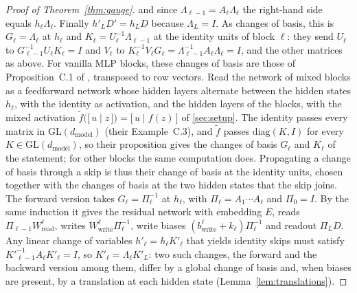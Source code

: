 \documentclass[10pt]{article}
\theoremstyle{definition}
\theoremstyle{remark}
\newcommand{\Wread}{W_{\mathrm{read}}}
\newcommand{\Wwrite}{W_{\mathrm{write}}}
\newcommand{\dm}{d_{\mathrm{model}}}
\newcommand{\GL}{\mathrm{GL}}
\begin{document}
\begin{proof}[Proof of Theorem~\ref{thm:gauge}]
and since $\Lambda_{\ell-1} = A_\ell\Lambda_\ell$ the right-hand side equals $h_\ell\Lambda_\ell$. Finally $h'_LD' = h_LD$ because $\Lambda_L = I$. As changes of basis, this is $G_\ell = \Lambda_\ell$ at $h_\ell$ and $K_\ell = U_\ell^{-1}\Lambda_{\ell-1}$ at the identity units of block $\ell$: they send $U_\ell$ to $G_{\ell-1}^{-1}U_\ell K_\ell = I$ and $V_\ell$ to $K_\ell^{-1}V_\ell G_\ell = \Lambda_{\ell-1}^{-1}A_\ell\Lambda_\ell = I$, and the other matrices as above. For vanilla MLP blocks, these changes of basis are those of Proposition~C.1 of \citet{zhao2023symmetries}, transposed to row vectors. Read the network of mixed blocks as a feedforward network whose hidden layers alternate between the hidden states $h_\ell$, with the identity as activation, and the hidden layers of the blocks, with the mixed activation $\tilde f\big(\big[\, u \;\big|\; z \,\big]\big) = \big[\, u \;\big|\; f(z) \,\big]$ of \cref{sec:setup}. The identity passes every matrix in $\GL(\dm)$ (their Example~C.3), and $\tilde f$ passes $\mathrm{diag}(K, I)$ for every $K \in \GL(\dm)$, so their proposition gives the changes of basis $G_\ell$ and $K_\ell$ of the statement; for other blocks the same computation does. Propagating a change of basis through a skip is thus their change of basis at the identity units, chosen together with the changes of basis at the two hidden states that the skip joins. The forward version takes $G_\ell = \Pi_\ell^{-1}$ at $h_\ell$, with $\Pi_\ell = A_1\cdots A_\ell$ and $\Pi_0 = I$. By the same induction it gives the residual network with embedding $E$, reads $\Pi_{\ell-1}\Wread^{\ell}$, writes $\Wwrite^{\ell}\Pi_\ell^{-1}$, write biases $(b^{\ell}_{\mathrm{write}} + k_\ell)\Pi_\ell^{-1}$ and readout $\Pi_LD$. Any linear change of variables $h'_\ell = h_\ell K'_\ell$ that yields identity skips must satisfy $K'^{-1}_{\ell-1}A_\ell K'_\ell = I$, so $K'_\ell = \Lambda_\ell K'_L$: two such changes, the forward and the backward version among them, differ by a global change of basis and, when biases are present, by a translation at each hidden state (Lemma~\ref{lem:translations}).


\end{proof}
\end{document}
